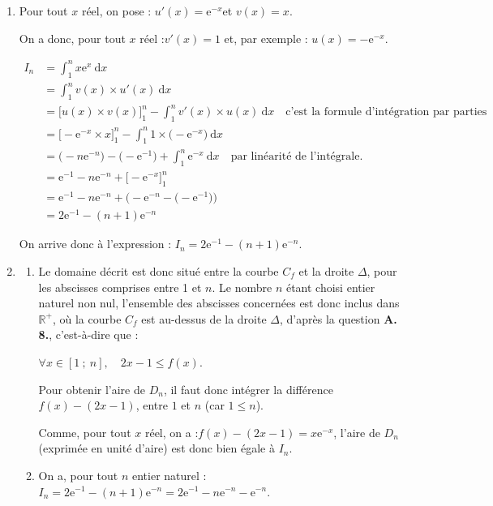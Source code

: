 \documentclass[10pt]{article}
\providecommand{\R}{\mathbb{R}}
\providecommand{\e}{{\mathrm{e}}}
\begin{document}
\begin{enumerate}
\item Pour tout $x$ réel, on pose : \quad $u'(x) = \e^{-x}$\quad et \quad$v(x) = x$.

On a donc, pour tout $x$ réel :\quad $v'(x) = 1$ \quad et, par exemple : \quad$u(x) = -\e^{-x}$.

$\begin{aligned} \displaystyle
I_{n}&= \int_{1}^{n} x\e^{x} ~\mathrm{d} x   \\
	&=\int_{1}^{n} v(x)\times u'(x)  ~\mathrm{d} x\\
	&= \Big[u(x) \times v(x)\Big]_1^n - \int_{1}^{n} v'(x)\times u(x) ~\mathrm{d} x\quad \text{c'est la formule d'intégration par parties}\\
	&= \Big[-\e^{-x} \times x\Big]_1^n - \int_{1}^{n} 1\times \big(-\e^{-x}\big) ~\mathrm{d} x\\
	&= \Big(-n\e^{-n}\Big)-\Big(-\e^{-1}\Big) + \int_{1}^{n} \e^{-x} ~\mathrm{d} x\quad \text{par linéarité de l'intégrale.}\\
	&= \e^{-1} -n\e^{-n} + \Big[-\e^{-x}\Big]_1^n\\
	&= \e^{-1} -n\e^{-n} + \Big(-\e^{-n} - \big(-\e^{-1}\big)\Big)\\
	&= 2\e^{-1} - (n+1)\e^{-n}
\end{aligned}$

On arrive donc à l'expression : \quad $I_n = 2\e^{-1} - (n+1)\e^{-n}$.
\item 
	\begin{enumerate}
		\item Le domaine décrit est donc situé entre la courbe $C_f$ et la droite $\Delta$, pour les abscisses comprises entre 1 et $n$. Le nombre $n$ étant choisi entier naturel non nul, l'ensemble des abscisses concernées est donc inclus dans $\R^{+}$, où la courbe $C_f$ est au-dessus de la droite $\Delta$, d'après la question \textbf{A. 8.}, c'est-à-dire que :

$\forall x \in [1 ~;~n], \quad 2x - 1 \leqslant f(x)$.

Pour obtenir l'aire de $D_n$, il faut donc intégrer la différence $f(x) - (2x - 1)$, entre $1$ et $n$ (car $1 \leqslant n$).

Comme, pour tout $x$ réel, on a :\quad $f(x) - (2x-1) = x\e^{-x}$, \quad l'aire de $D_n$ (exprimée en unité d'aire) est donc bien égale à $I_n$.

		\item On a, pour tout $n$ entier naturel :\quad $I_n = 2\e^{-1} - (n+1)\e^{-n} = 2\e^{-1} - n\e^{-n} -\e^{-n}$.


\end{enumerate}
\end{enumerate}
\end{document}
